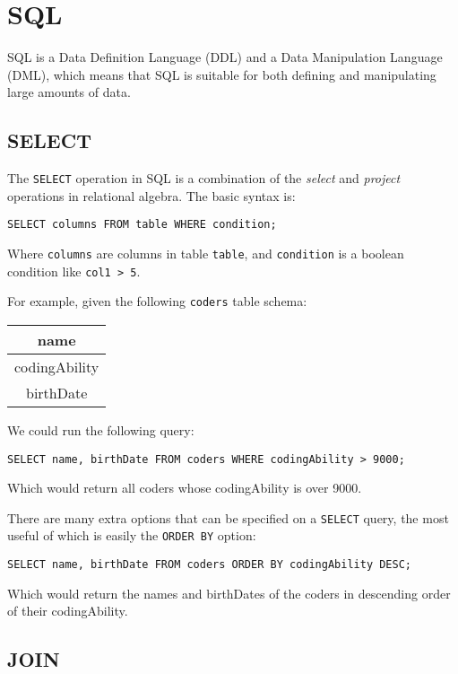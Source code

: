 \chapter{SQL}

SQL is a Data Definition Language (DDL) and a Data Manipulation
Language (DML), which means that SQL is suitable for both defining and
manipulating large amounts of data.

\section{SELECT}

The \texttt{SELECT} operation in SQL is a combination of the
\emph{select} and \emph{project} operations in relational algebra.
The basic syntax is:

\texttt{SELECT columns FROM table WHERE condition;}

Where \texttt{columns} are columns in table \texttt{table}, and
\texttt{condition} is a boolean condition like \texttt{col1 > 5}.

For example, given the following \texttt{coders} table schema:

\begin{tabular}{|c|}
  
  \hline
  {\bf name} \\
  \hline
  codingAbility \\
  \hline
  birthDate \\
  \hline
  
\end{tabular}

We could run the following query:

\texttt{SELECT name, birthDate FROM coders \newline
WHERE codingAbility > 9000;}

Which would return all coders whose codingAbility is over 9000.

There are many extra options that can be specified on a
\texttt{SELECT} query, the most useful of which is easily the
\texttt{ORDER BY} option:

\texttt{SELECT name, birthDate FROM coders \newline
ORDER BY codingAbility DESC;}

Which would return the names and birthDates of the coders in
descending order of their codingAbility.

\section{JOIN}

